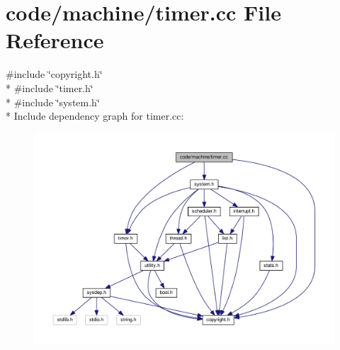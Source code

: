 \section{code/machine/timer.cc File Reference}
\label{timer_8cc}
{\ttfamily \#include \char`\"{}copyright.\+h\char`\"{}}\\*
{\ttfamily \#include \char`\"{}timer.\+h\char`\"{}}\\*
{\ttfamily \#include \char`\"{}system.\+h\char`\"{}}\\*
Include dependency graph for timer.\+cc\+:
\nopagebreak
\begin{figure}[H]
\begin{center}
\leavevmode
\includegraphics[width=350pt]{timer_8cc__incl}
\end{center}
\end{figure}
